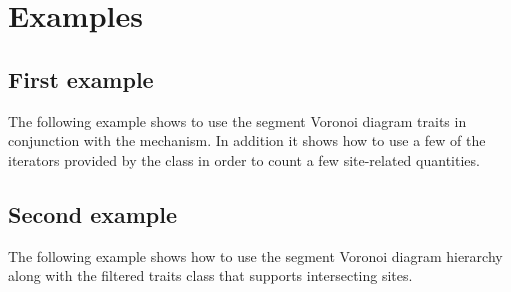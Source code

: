 
\section{Examples}
\label{sec:segvor2-examples}

\subsection{First example}

The following example shows to use the segment Voronoi diagram traits
in conjunction with the  mechanism. In
addition it shows how to use a few of the iterators provided by the
 class in order to count a few
site-related quantities.


\subsection{Second example}

The following example shows how to use the segment Voronoi diagram
hierarchy along with the filtered traits class that supports
intersecting sites.



